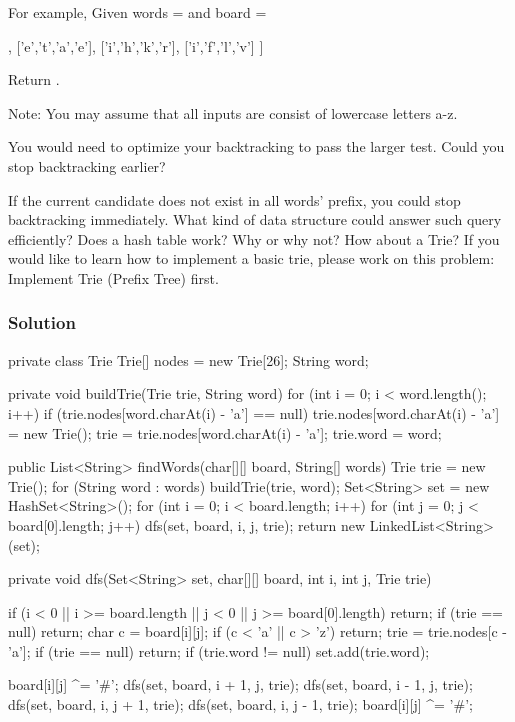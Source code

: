For example,
Given words =  and board =
\begin{Code}
[
  ['o','a','a','n'],
  ['e','t','a','e'],
  ['i','h','k','r'],
  ['i','f','l','v']
]
\end{Code}
Return .

Note:
You may assume that all inputs are consist of lowercase letters a-z.

You would need to optimize your backtracking to pass the larger test. Could you stop backtracking earlier?

If the current candidate does not exist in all words' prefix, you could stop backtracking immediately. What kind of data structure could answer such query efficiently? Does a hash table work? Why or why not? How about a Trie? If you would like to learn how to implement a basic trie, please work on this problem: Implement Trie (Prefix Tree) first.

\subsubsection{Solution}

\begin{Code}
private class Trie {
    Trie[] nodes = new Trie[26];
    String word;
}

private void buildTrie(Trie trie, String word) {
    for (int i = 0; i < word.length(); i++) {
        if (trie.nodes[word.charAt(i) - 'a'] == null) {
            trie.nodes[word.charAt(i) - 'a'] = new Trie();
        }
        trie = trie.nodes[word.charAt(i) - 'a'];
    }
    trie.word = word;
}
\end{Code}

\newpage

\begin{Code}

public List<String> findWords(char[][] board, String[] words) {
    Trie trie = new Trie();
    for (String word : words) {
        buildTrie(trie, word);
    }
    Set<String> set = new HashSet<String>();
    for (int i = 0; i < board.length; i++) {
        for (int j = 0; j < board[0].length; j++) {
            dfs(set, board, i, j, trie);
        }
    }
    return new LinkedList<String>(set);
}

private void dfs(Set<String> set, char[][] board, int i, int j, Trie trie) {
    if (i < 0 || i >= board.length || j < 0 || j >= board[0].length) {
        return;
    }
    if (trie == null) {
        return;
    }
    char c = board[i][j];
    if (c < 'a' || c > 'z') {
        return;
    }
    trie = trie.nodes[c - 'a'];
    if (trie == null) {
        return;
    }
    if (trie.word != null) {
        set.add(trie.word);
    }

    board[i][j] ^= '#';
    dfs(set, board, i + 1, j, trie);
    dfs(set, board, i - 1, j, trie);
    dfs(set, board, i, j + 1, trie);
    dfs(set, board, i, j - 1, trie);
    board[i][j] ^= '#';
}
\end{Code}

